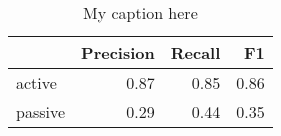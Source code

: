 \begin{table}[!ht]
\centering
\begin{tabular}{lrrr}
\toprule
{} &  Precision &  Recall &   F1 \\
\midrule
active  &       0.87 &    0.85 & 0.86 \\
passive &       0.29 &    0.44 & 0.35 \\
\bottomrule
\end{tabular}
\caption{My caption here}
\label{tab:VOICE-ocd-combined-F1}
\end{table}